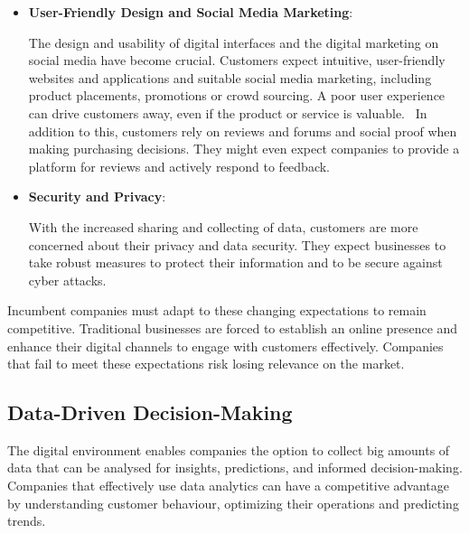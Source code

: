 \documentclass[a4]{scrartcl}
\begin{document}
\begin{itemize}
	
	\item \textbf{User-Friendly Design and Social Media Marketing}: 
	
	The design and usability of digital interfaces and the digital marketing on social media have become crucial. Customers expect intuitive, user-friendly websites and applications and suitable social media marketing, including product placements, promotions or crowd sourcing. A poor user experience can drive customers away, even if the product or service is valuable.~\cite{socialmedia}
	In addition to this, customers rely on reviews and forums and social proof when making purchasing decisions. They might even expect companies to provide a platform for reviews and actively respond to feedback.~\cite{socialmedia}
	
	\item \textbf{Security and Privacy}: 
	
	With the increased sharing and collecting of data, customers are more concerned about their privacy and data security. They expect businesses to take robust measures to protect their information and to be secure against cyber attacks. \cite{masterthesis, cybersecurity}

\end{itemize}
	
		
Incumbent companies must adapt to these changing expectations to remain competitive. Traditional businesses are forced to establish an online presence and enhance their digital channels to engage with  customers effectively. Companies that fail to meet these expectations risk losing relevance on the market.~\cite{socialmedia, masterthesis, digitalmatrix, leadingdigital}

	
	

	
	
\subsection{Data-Driven Decision-Making} \label{subsec:DataDrivenDecisionMaking}

	The digital environment enables companies the option to collect big amounts of data that can be analysed for insights, predictions, and informed decision-making. Companies that effectively use data analytics can have a competitive advantage by understanding customer behaviour, optimizing their operations and predicting trends.~\cite{DDDM, masterthesis}
	
\end{document}
